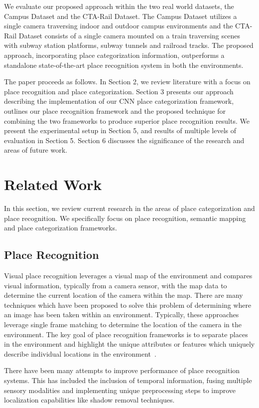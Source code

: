 \documentclass[letterpaper, 10 pt, conference]{ieeeconf}  %
\begin{document}
We evaluate our proposed approach within the two real world datasets, the Campus Dataset and the CTA-Rail Dataset. The Campus Dataset utilizes a single camera traversing indoor and outdoor campus environments and the CTA-Rail Dataset consists of a single camera mounted on a train traversing scenes with subway station platforms, subway tunnels and railroad tracks. The proposed approach, incorporating place categorization information,  outperforms a standalone state-of-the-art place recognition system in both the environments.  

The paper proceeds as follows. In Section 2, we review literature with a focus on place recognition and place categorization. Section 3 presents our approach describing the implementation of our CNN place categorization framework, outlines our place recognition framework and the proposed technique for combining the two frameworks to produce superior place recognition results. We present the experimental setup in Section 5, and results of multiple levels of evaluation in Section 5. Section 6 discusses the significance of the research and areas of future work.

\section{Related Work}
In this section, we review current research in the areas of place categorization and place recognition. We specifically focus on place recognition, semantic mapping and place categorization frameworks. 

\subsection{Place Recognition}
Visual place recognition leverages a visual map of the environment and compares visual information, typically from a camera sensor, with the map data to determine the current location of the camera within the map. There are many techniques which have been proposed to solve this problem of determining where an image has been taken within an environment. Typically, these approaches leverage single frame matching to determine the location of the camera in the environment. The key goal of place recognition frameworks is to separate places in the environment and highlight the unique attributes or features which uniquely describe individual locations in the environment~\cite{Cummins2009,nister2006scalable}. 

There have been many attempts to improve performance of place recognition systems. This has included the inclusion of temporal information, fusing multiple sensory modalities and implementing unique preprocessing steps to improve localization capabilities like shadow removal techniques. 
\end{document}
